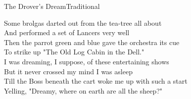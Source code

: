 \documentclass[a4paper,12pt]{article}
\begin{document}
\begin{song}{The Drover's Dream}{Traditional}
\bigskip\par

	Some brolgas darted out from the tea-tree all about\\ 
	And performed a set of Lancers very well\\ 
	Then the parrot green and blue gave the orchestra its cue\\
To strike up "The Old Log Cabin in the Dell."\\
	I was dreaming, I suppose, of these entertaining shows\\ 
	But it never crossed my mind I was asleep\\ 
	Till the Boss beneath the cart woke me up with such a start\\ 
	Yelling, "Dreamy, where on earth are all the sheep?" 
\end{song}
\end{document}
